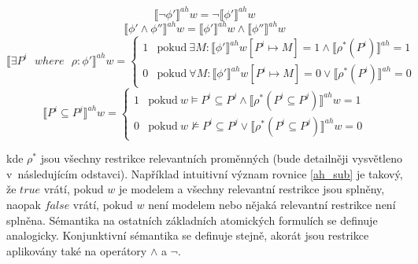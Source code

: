 \begin{equation}
    \llbracket \neg \phi' \rrbracket^{ah}w = \neg \llbracket \phi' \rrbracket^{ah}w
\end{equation}
\begin{equation}
    \llbracket \phi' \wedge \phi'' \rrbracket^{ah}w = \llbracket \phi' \rrbracket^{ah}w \wedge \llbracket \phi'' \rrbracket^{ah}w
\end{equation}
\begin{equation}
    \llbracket \exists P^i \text{ } where \text{ } \rho: \phi' \rrbracket^{ah}w = 
    \begin{cases}
        1 & \text{pokud}\ \exists M: \llbracket \phi' \rrbracket^{ah} w[P^i \mapsto M]=1 \wedge \llbracket \rho^* (P^i) \rrbracket^{ah}=1 \\
        0 & \text{pokud}\ \forall M: \llbracket \phi' \rrbracket^{ah} w[P^i \mapsto M]=0 \vee \llbracket \rho^* (P^i) \rrbracket^{ah}=0
    \end{cases}
\end{equation}
\begin{equation}
    \label{ah_sub}
    \llbracket P^i \subseteq P^j \rrbracket^{ah}w=
    \begin{cases}
        1 & \text{pokud}\ w \vDash P^i \subseteq P^j \wedge \llbracket \rho^* (P^i \subseteq P^j) \rrbracket^{ah}w=1  \\
        0 & \text{pokud}\ w \nvDash P^i \subseteq P^j \vee \llbracket \rho^* (P^i \subseteq P^j) \rrbracket^{ah}w=0
    \end{cases}
\end{equation}

kde $\rho^*$ jsou všechny restrikce relevantních proměnných (bude detailněji vysvětleno v~následujícím odstavci). Například intuitivní význam rovnice \ref{ah_sub} je takový, že $true$ vrátí, pokud $w$ je modelem a všechny relevantní restrikce jsou splněny, naopak $false$ vrátí, pokud $w$ není modelem nebo nějaká relevantní restrikce není splněna. Sémantika na ostatních základních atomických formulích se definuje analogicky. Konjunktivní sémantika se definuje stejně, akorát jsou restrikce aplikovány také na operátory $\wedge$ a $\neg$.

